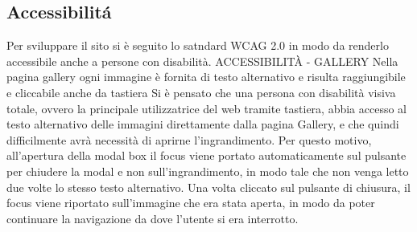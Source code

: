	\subsection{Accessibilit\'a}
		Per sviluppare il sito si è seguito lo satndard WCAG 2.0 in modo da renderlo accessibile anche a persone con disabilità.
		ACCESSIBILITÀ - GALLERY
		Nella pagina gallery ogni immagine è fornita di testo alternativo e risulta raggiungibile e cliccabile anche da tastiera
		Si è pensato che una persona con disabilità visiva totale, ovvero la principale utilizzatrice del web tramite tastiera, abbia accesso al testo alternativo delle immagini direttamente dalla pagina Gallery, e che quindi difficilmente avrà necessità di aprirne l'ingrandimento.
		Per questo motivo, all'apertura della modal box il focus viene portato automaticamente sul pulsante per chiudere la modal e non sull'ingrandimento, in modo tale che non venga letto due volte lo stesso testo alternativo.
		Una volta cliccato sul pulsante di chiusura, il focus viene riportato sull'immagine che era stata aperta, in modo da poter continuare la navigazione da dove l'utente si era interrotto. 
